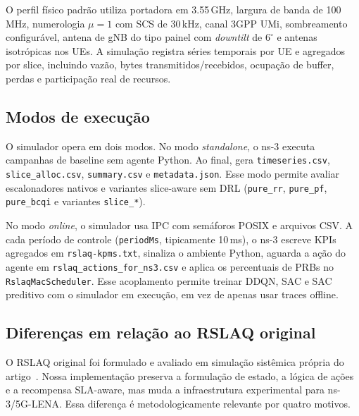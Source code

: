 \documentclass[10pt,a4paper]{IEEEtran}
\begin{document}
O perfil f\'{i}sico padr\~{a}o utiliza portadora em
3.55\,GHz, largura de banda de 100\,MHz, numerologia $\mu=1$
com SCS de 30\,kHz, canal 3GPP UMi, sombreamento
configur\'{a}vel, antena de gNB do tipo painel com
\emph{downtilt} de $6^\circ$ e antenas isotr\'{o}picas nos UEs.
A simula\c{c}\~{a}o registra s\'{e}ries temporais por UE e
agregados por slice, incluindo vaz\~{a}o, bytes
transmitidos/recebidos, ocupa\c{c}\~{a}o de buffer, perdas e
participa\c{c}\~{a}o real de recursos.

\subsection{Modos de execu\c{c}\~{a}o}

O simulador opera em dois modos. No modo \emph{standalone}, o
ns-3 executa campanhas de baseline sem agente Python. Ao final,
gera \texttt{timeseries.csv}, \texttt{slice\_alloc.csv},
\texttt{summary.csv} e \texttt{metadata.json}. Esse modo permite
avaliar escalonadores nativos e variantes slice-aware sem DRL
(\texttt{pure\_rr}, \texttt{pure\_pf}, \texttt{pure\_bcqi} e
variantes \texttt{slice\_*}).

No modo \emph{online}, o simulador usa IPC com sem\'{a}foros
POSIX e arquivos CSV. A cada per\'{i}odo de controle
(\texttt{periodMs}, tipicamente 10\,ms), o ns-3 escreve KPIs
agregados em \texttt{rslaq-kpms.txt}, sinaliza o ambiente
Python, aguarda a a\c{c}\~{a}o do agente em
\texttt{rslaq\_actions\_for\_ns3.csv} e aplica os percentuais
de PRBs no \texttt{RslaqMacScheduler}. Esse acoplamento permite
treinar DDQN, SAC e SAC preditivo com o simulador em
execu\c{c}\~{a}o, em vez de apenas usar traces offline.

\subsection{Diferen\c{c}as em rela\c{c}\~{a}o ao RSLAQ original}
\label{sec:diff_rslaq}

O RSLAQ original foi formulado e avaliado em simula\c{c}\~{a}o
sist\^{e}mica pr\'{o}pria do artigo~\cite{yungaicela2026rslaq}.
Nossa implementa\c{c}\~{a}o preserva a formula\c{c}\~{a}o de
estado, a l\'{o}gica de a\c{c}\~{o}es e a recompensa SLA-aware,
mas muda a infraestrutura experimental para ns-3/5G-LENA. Essa
diferen\c{c}a \'{e} metodologicamente relevante por quatro
motivos.
\end{document}
